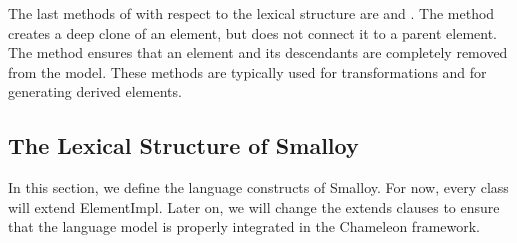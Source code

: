 The last methods of  with respect to the lexical structure are  and . The  method creates a deep clone of an element, but does not connect it to a parent element. The  method ensures that an element and its descendants are completely removed from the model. These methods are typically used for transformations and for generating derived elements.

\subsection{The Lexical Structure of Smalloy}

In this section, we define the language constructs of Smalloy. For now, every class will extend ElementImpl. Later on, we will change the extends clauses to ensure that the language model is properly integrated in the Chameleon framework.
\begin{java}
 
\end{java}
